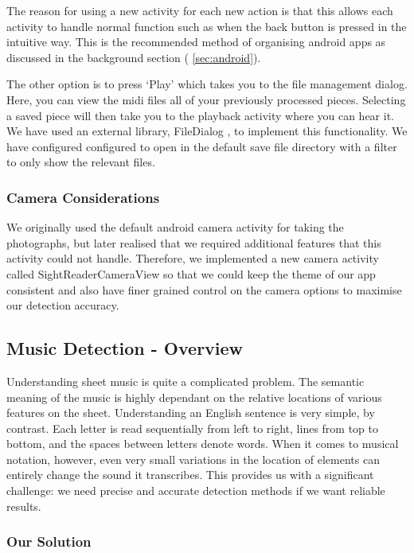 The reason for using a new activity for each new action is that this allows each activity to handle normal function such as when the back button is pressed in the intuitive way. This is the recommended method of organising android apps as discussed in the background section ( \autoref{sec:android}).

The other option is to press ‘Play’ which takes you to the file management dialog. Here, you can view the midi files all of your previously processed pieces. Selecting a saved piece will then take you to the playback activity where you can hear it. We have used an external library, FileDialog\cite{FileDialog} , to implement this functionality. We have configured configured to open in the default save file directory with a filter to only show the relevant files.


\subsubsection{Camera Considerations}
We originally used the default android camera activity for taking the photographs, but later realised that we required additional features that this activity could not handle. Therefore, we implemented a new camera activity called SightReaderCameraView so that we could keep the theme of our app consistent and also have finer grained control on the camera options to maximise our detection accuracy.

\subsection{Music Detection - Overview}
Understanding sheet music is quite a complicated problem. The semantic meaning of the music is highly dependant on the relative locations of various features on the sheet. Understanding an English sentence is very simple, by contrast. Each letter is read sequentially from left to right, lines from top to bottom, and the spaces between letters denote words. When it comes to musical notation, however, even very small variations in the location of elements can entirely change the sound it
transcribes. This provides us with a significant challenge: we need precise and accurate detection methods if we want reliable results.

\subsubsection{Our Solution}

